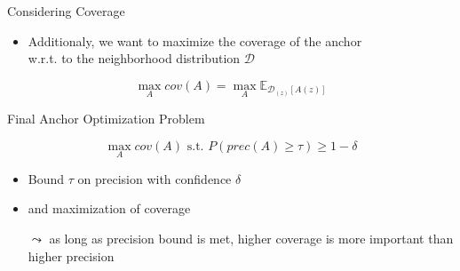\documentclass[aspectratio=169]{../latex_main/tntbeamer}  %
\begin{document}

\begin{frame}[c]{Considering Coverage}

\begin{itemize}
    \item Additionaly, we want to maximize the coverage of the anchor\\ w.r.t. to the neighborhood distribution $\mathcal{D}$
\end{itemize}

$$\max_{A} cov(A) = \max_{A} \mathbb{E}_{\mathcal{D}_{(z)}[A(z)]} $$


\end{frame}


\begin{frame}[c]{Final Anchor Optimization Problem}

\begin{equation}
\max_{A} cov(A) \text{ s.t. } P(prec(A) \geq \tau) \geq 1 - \delta
\end{equation}

\begin{itemize}
    \item Bound $\tau$ on precision with confidence $\delta$
    \item and maximization of coverage
    \item[$\leadsto$] as long as precision bound is met, higher coverage is more important than higher precision
\end{itemize}


\end{frame}

\end{document}
